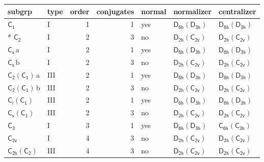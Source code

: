 \documentclass[10pt,a4paper]{article}
\numberwithin{equation}{section}
\newcommand{\grp}[1]{\mathsf{#1}}
\newcommand{\clsletter}[1]{\,{\scriptsize\color{black!55}#1}}
\begin{document}
{\small\begin{longtable}{@{}llrrlll@{}}\toprule
subgrp & type & order & conjugates & normal & normalizer & centralizer\\\midrule\endhead
\bottomrule\endfoot\endlastfoot
\href{../../../rotation/data/pdf/C1.pdf}{$\grp{C_{1}}$} & I & 1 & 1 & yes & \href{D6h-D3h.pdf}{$\grp{D_{6h}}(\grp{D_{3h}})$} & \href{D6h-D3h.pdf}{$\grp{D_{6h}}(\grp{D_{3h}})$}\\*
\href{../../../rotation/data/pdf/C2.pdf}{$\grp{C_{2}}$} & I & 2 & 3 & no & \href{D2h-C2v.pdf}{$\grp{D_{2h}}(\grp{C_{2v}})$} & \href{D2h-C2v.pdf}{$\grp{D_{2h}}(\grp{C_{2v}})$}\\
\href{../../../rotation/data/pdf/C1v.pdf}{$\grp{C_{s}}$}\clsletter{a} & I & 2 & 1 & yes & \href{D6h-D3h.pdf}{$\grp{D_{6h}}(\grp{D_{3h}})$} & \href{D6h-D3h.pdf}{$\grp{D_{6h}}(\grp{D_{3h}})$}\\
\href{../../../rotation/data/pdf/C1v.pdf}{$\grp{C_{s}}$}\clsletter{b} & I & 2 & 3 & no & \href{D2h-C2v.pdf}{$\grp{D_{2h}}(\grp{C_{2v}})$} & \href{D2h-C2v.pdf}{$\grp{D_{2h}}(\grp{C_{2v}})$}\\
\href{C2-C1.pdf}{$\grp{C_{2}}(\grp{C_{1}})$}\clsletter{a} & III & 2 & 1 & yes & \href{D6h-D3h.pdf}{$\grp{D_{6h}}(\grp{D_{3h}})$} & \href{D6h-D3h.pdf}{$\grp{D_{6h}}(\grp{D_{3h}})$}\\
\href{C2-C1.pdf}{$\grp{C_{2}}(\grp{C_{1}})$}\clsletter{b} & III & 2 & 3 & no & \href{D2h-C2v.pdf}{$\grp{D_{2h}}(\grp{C_{2v}})$} & \href{D2h-C2v.pdf}{$\grp{D_{2h}}(\grp{C_{2v}})$}\\
\href{S2-C1.pdf}{$\grp{C_{i}}(\grp{C_{1}})$} & III & 2 & 1 & yes & \href{D6h-D3h.pdf}{$\grp{D_{6h}}(\grp{D_{3h}})$} & \href{D6h-D3h.pdf}{$\grp{D_{6h}}(\grp{D_{3h}})$}\\
\href{C1v-C1.pdf}{$\grp{C_{s}}(\grp{C_{1}})$} & III & 2 & 3 & no & \href{D2h-C2v.pdf}{$\grp{D_{2h}}(\grp{C_{2v}})$} & \href{D2h-C2v.pdf}{$\grp{D_{2h}}(\grp{C_{2v}})$}\\
\href{../../../rotation/data/pdf/C3.pdf}{$\grp{C_{3}}$} & I & 3 & 1 & yes & \href{D6h-D3h.pdf}{$\grp{D_{6h}}(\grp{D_{3h}})$} & \href{C6h-C3h.pdf}{$\grp{C_{6h}}(\grp{C_{3h}})$}\\
\href{../../../rotation/data/pdf/C2v.pdf}{$\grp{C_{2v}}$} & I & 4 & 3 & no & \href{D2h-C2v.pdf}{$\grp{D_{2h}}(\grp{C_{2v}})$} & \href{D2h-C2v.pdf}{$\grp{D_{2h}}(\grp{C_{2v}})$}\\
\href{C2h-C2.pdf}{$\grp{C_{2h}}(\grp{C_{2}})$} & III & 4 & 3 & no & \href{D2h-C2v.pdf}{$\grp{D_{2h}}(\grp{C_{2v}})$} & \href{D2h-C2v.pdf}{$\grp{D_{2h}}(\grp{C_{2v}})$}\\

\end{longtable}}
\end{document}
